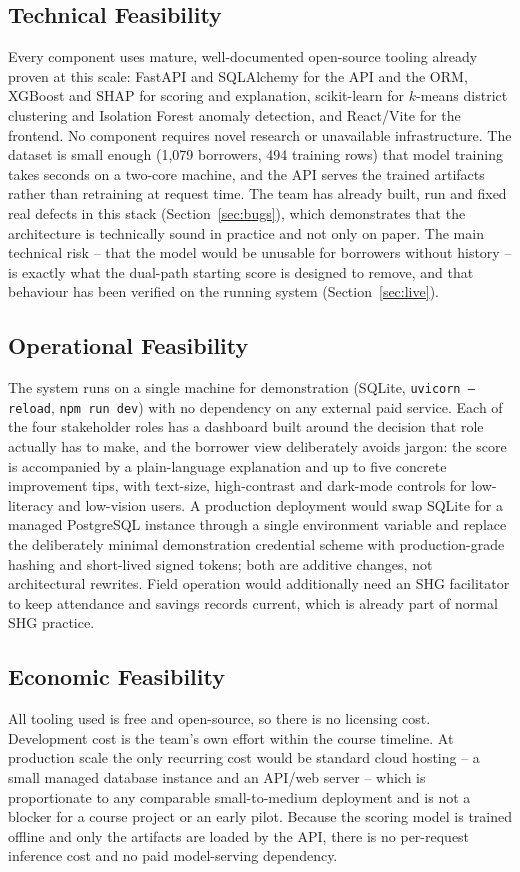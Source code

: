 \documentclass[11pt,a4paper]{article}
\newcommand{\code}[1]{\texttt{\small #1}}
\begin{document}
\subsection{Technical Feasibility}
Every component uses mature, well-documented open-source tooling already
proven at this scale: FastAPI and SQLAlchemy for the API and the ORM,
XGBoost and SHAP for scoring and explanation, scikit-learn for $k$-means
district clustering and Isolation Forest anomaly detection, and
React/Vite for the frontend. No component requires novel research or
unavailable infrastructure. The dataset is small enough (1{,}079 borrowers,
494 training rows) that model training takes seconds on a two-core machine,
and the API serves the trained artifacts rather than retraining at request
time. The team has already built, run and fixed real defects in this stack
(Section~\ref{sec:bugs}), which demonstrates that the architecture is
technically sound in practice and not only on paper. The main technical
risk -- that the model would be unusable for borrowers without history --
is exactly what the dual-path starting score is designed to remove, and
that behaviour has been verified on the running system
(Section~\ref{sec:live}).

\subsection{Operational Feasibility}
The system runs on a single machine for demonstration (SQLite,
\code{uvicorn --reload}, \code{npm run dev}) with no dependency on any
external paid service. Each of the four stakeholder roles has a dashboard
built around the decision that role actually has to make, and the borrower
view deliberately avoids jargon: the score is accompanied by a
plain-language explanation and up to five concrete improvement tips, with
text-size, high-contrast and dark-mode controls for low-literacy and
low-vision users. A production deployment would swap SQLite for a managed
PostgreSQL instance through a single environment variable and replace the
deliberately minimal demonstration credential scheme with production-grade
hashing and short-lived signed tokens; both are additive changes, not
architectural rewrites. Field operation would additionally need an SHG
facilitator to keep attendance and savings records current, which is
already part of normal SHG practice.

\subsection{Economic Feasibility}
All tooling used is free and open-source, so there is no licensing cost.
Development cost is the team's own effort within the course timeline. At
production scale the only recurring cost would be standard cloud hosting --
a small managed database instance and an API/web server -- which is
proportionate to any comparable small-to-medium deployment and is not a
blocker for a course project or an early pilot. Because the scoring model
is trained offline and only the artifacts are loaded by the API, there is
no per-request inference cost and no paid model-serving dependency.
\end{document}
